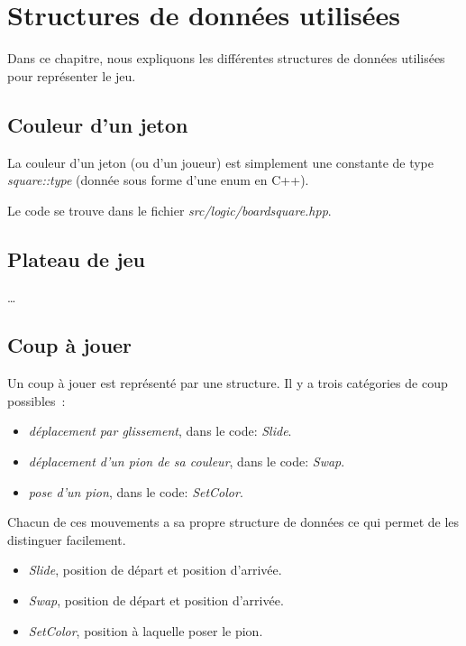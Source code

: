 \chapter{Structures de données utilisées}\label{chapter:structures-donnees}

Dans ce chapitre, nous expliquons les différentes structures de données utilisées pour représenter le jeu.

\section{Couleur d'un jeton}

La couleur d'un jeton (ou d'un joueur) est simplement une constante de type \emph{square::type} (donnée
sous forme d'une enum en C++).

Le code se trouve dans le fichier \emph{src/logic/boardsquare.hpp}.

\section{Plateau de jeu}\label{struct:boardstate}

…

\section{Coup à jouer}

Un coup à jouer est représenté par une structure.
Il y a trois catégories de coup possibles :
\begin{itemize}
    \item \emph{déplacement par glissement}, dans le code: \emph{Slide}.
    \item \emph{déplacement d'un pion de sa couleur}, dans le code: \emph{Swap}.
    \item \emph{pose d'un pion}, dans le code: \emph{SetColor}.
\end{itemize}

Chacun de ces mouvements a sa propre structure de données ce qui permet de les distinguer facilement.
\begin{itemize}
    \item \emph{Slide}, position de départ et position d'arrivée.
    \item \emph{Swap}, position de départ et position d'arrivée.
    \item \emph{SetColor}, position à laquelle poser le pion.
\end{itemize}

